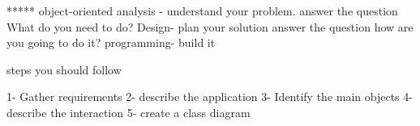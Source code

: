 *****  object-oriented 
analysis - understand your problem.
answer the question   What do you need to do? 
Design- plan your solution 
answer the question how are you going to do it?
programming- build it  


steps you should follow 

1- Gather requirements 
2- describe the application 
3- Identify the main objects 
4- describe the interaction 
5- create a class diagram 
